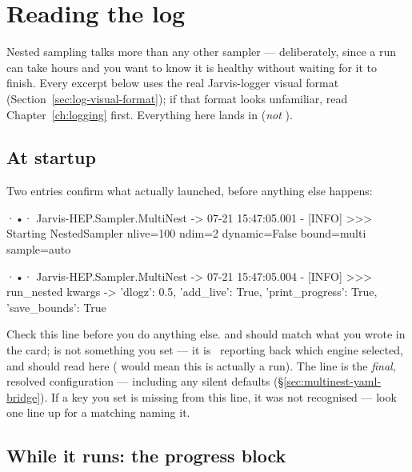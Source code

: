 \section{Reading the log}
\label{sec:nested-log}

Nested sampling talks more than any other sampler --- deliberately, since a run can
take hours and you want to know it is healthy without waiting for it to finish. Every
excerpt below uses the real Jarvis-logger visual format
(Section~\ref{sec:log-visual-format}); if that format looks unfamiliar, read
Chapter~\ref{ch:logging} first. Everything here lands in 
(\emph{not} ).

\subsection{At startup}
\label{sec:nested-log-startup}

Two entries confirm what actually launched, before anything else happens:

\begin{terminal}
\begin{jout}
·•· Jarvis-HEP.Sampler.MultiNest
	-> 07-21 15:47:05.001 - [INFO] >>>
Starting NestedSampler nlive=100 ndim=2 dynamic=False bound=multi sample=auto

·•· Jarvis-HEP.Sampler.MultiNest
	-> 07-21 15:47:05.004 - [INFO] >>>
run_nested kwargs -> {'dlogz': 0.5, 'add_live': True, 'print_progress': True,
                       'save_bounds': True}
\end{jout}
\end{terminal}

\begin{jtip}
Check this line before you do anything else.  and 
should match what you wrote in the card;  is not something you set
--- it is \Jtwo\ reporting back which engine  selected, and should
read  here ( would mean this is actually a
 run). The  line is the \emph{final},
resolved configuration --- including any silent defaults
(\S\ref{sec:multinest-yaml-bridge}). If a key you set is missing from this line, it
was not recognised --- look one line up for a matching  naming it.
\end{jtip}

\subsection{While it runs: the progress block}
\label{sec:nested-log-progress}

